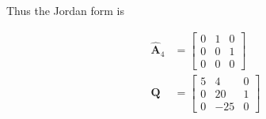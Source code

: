 \begin{itemize}
 Thus the Jordan form is

 \begin{align*}
 \hat {\mathbf{A}}_4 &= \begin{bmatrix}
                       0 & 1 & 0\\ 0&0&1\\0&0&0
                      \end{bmatrix}\\
  \mathbf{Q} &= \begin{bmatrix}
   5 & 4 & 0\\
   0 & 20 & 1\\
   0 & -25 &0
  \end{bmatrix}
 \end{align*}

\end{itemize}
